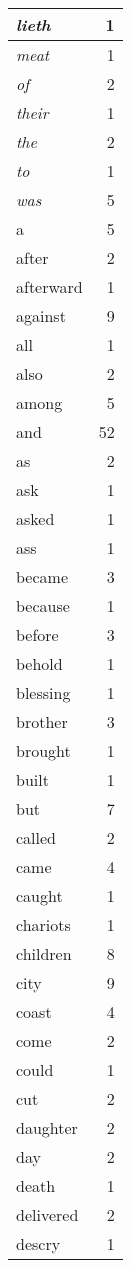 \begin{center}
\begin{longtable}{l|r}
\emph{lieth} & 1 \\ \hline
\emph{meat} & 1 \\ \hline
\emph{of} & 2 \\ \hline
\emph{their} & 1 \\ \hline
\emph{the} & 2 \\ \hline
\emph{to} & 1 \\ \hline
\emph{was} & 5 \\ \hline
a & 5 \\ \hline
after & 2 \\ \hline
afterward & 1 \\ \hline
against & 9 \\ \hline
all & 1 \\ \hline
also & 2 \\ \hline
among & 5 \\ \hline
and & 52 \\ \hline
as & 2 \\ \hline
ask & 1 \\ \hline
asked & 1 \\ \hline
ass & 1 \\ \hline
became & 3 \\ \hline
because & 1 \\ \hline
before & 3 \\ \hline
behold & 1 \\ \hline
blessing & 1 \\ \hline
brother & 3 \\ \hline
brought & 1 \\ \hline
built & 1 \\ \hline
but & 7 \\ \hline
called & 2 \\ \hline
came & 4 \\ \hline
caught & 1 \\ \hline
chariots & 1 \\ \hline
children & 8 \\ \hline
city & 9 \\ \hline
coast & 4 \\ \hline
come & 2 \\ \hline
could & 1 \\ \hline
cut & 2 \\ \hline
daughter & 2 \\ \hline
day & 2 \\ \hline
death & 1 \\ \hline
delivered & 2 \\ \hline
descry & 1 \\ \hline

\end{longtable}
\end{center}

